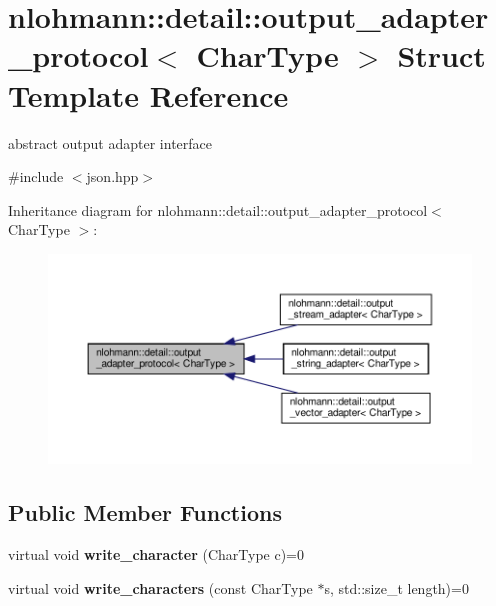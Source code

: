 \hypertarget{structnlohmann_1_1detail_1_1output__adapter__protocol}{}\section{nlohmann\+:\+:detail\+:\+:output\+\_\+adapter\+\_\+protocol$<$ Char\+Type $>$ Struct Template Reference}
\label{structnlohmann_1_1detail_1_1output__adapter__protocol}


abstract output adapter interface  




{\ttfamily \#include $<$json.\+hpp$>$}



Inheritance diagram for nlohmann\+:\+:detail\+:\+:output\+\_\+adapter\+\_\+protocol$<$ Char\+Type $>$\+:
\nopagebreak
\begin{figure}[H]
\begin{center}
\leavevmode
\includegraphics[width=350pt]{structnlohmann_1_1detail_1_1output__adapter__protocol__inherit__graph}
\end{center}
\end{figure}
\subsection*{Public Member Functions}
\begin{DoxyCompactItemize}
\item 
\mbox{\label{structnlohmann_1_1detail_1_1output__adapter__protocol_a3381896fe1be557f591de2e917cdc7d5}} 
virtual void {\bfseries write\+\_\+character} (Char\+Type c)=0
\item 
\mbox{\label{structnlohmann_1_1detail_1_1output__adapter__protocol_a2f410a164e0eda17cf6561114b0eee4a}} 
virtual void {\bfseries write\+\_\+characters} (const Char\+Type $\ast$s, std\+::size\+\_\+t length)=0
\end{DoxyCompactItemize}


